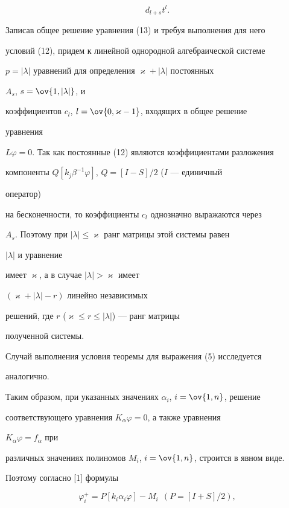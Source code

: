 \begin{pf}
\begin{equation}
d_{l+s}t^l. 


\end{equation} 


Записав общее решение уравнения (13) и требуя выполнения для него 


условий (12), придем к линейной однородной алгебраической системе 


$p=|\lambda|$ уравнений для определения $\varkappa+|\lambda|$ постоянных 


$A_s$, $s=\ov{1,|\lambda|}$, и 


коэффициентов $c_l$, $l=\ov{0,\varkappa-1}$, входящих в общее решение 


уравнения 


$L\varphi=0$. Так как постоянные (12) являются коэффициентами разложения 


компоненты $Q[k_j\beta^{-1}\varphi]$, $Q=[I-S]/2$ ($I$ --- единичный 


оператор) 


на бесконечности, то коэффициенты $c_l$ однозначно выражаются через 


$A_s$. Поэтому при $|\lambda|\le\varkappa$ ранг матрицы этой системы равен 


$|\lambda|$ и уравнение 


имеет $\varkappa$, а в случае $|\lambda|>\varkappa$ имеет 


$(\varkappa+|\lambda|-r)$ линейно независимых 


решений, где $r$ ($\varkappa\le r\le|\lambda|$) --- ранг матрицы 


полученной системы. 


 


Случай выполнения условия теоремы для выражения (5) исследуется 


аналогично. 


 


Таким образом, при указанных значениях $\alpha_i$, $i=\ov{1,n}$, решение 


соответствующего уравнения $K_\alpha\varphi=0$, а также уравнения 


$K_\alpha\varphi=f_\alpha$ при 


различных значениях полиномов $M_i$, $i=\ov{1,n}$, строится в явном виде. 


Поэтому согласно [1] формулы 


\begin{equation} 


\varphi^+_i=P[k_i\alpha_i\varphi]-M_i\ \ (P=[I+S]/2), 



\end{equation}
\end{pf}
